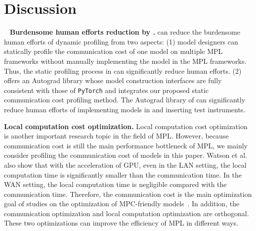 \section{Discussion}~\label{sec:dis}
\noindent\textbf{Burdensome human efforts reduction by \hawkeye.} \hawkeye can reduce the burdensome human efforts of dynamic profiling from two aspects: (1) model designers can statically profile the communication cost of one model on multiple MPL frameworks without manually implementing the model in the MPL frameworks. Thus, the static profiling process in \hawkeye can significantly reduce human efforts. (2) \hawkeye offers an Autograd library whose model construction interfaces are fully consistent with those of \texttt{PyTorch} and integrates our proposed static communication cost profiling method. The Autograd library of \hawkeye can significantly reduce human efforts of implementing models in \hawkeye and inserting test instruments.

\noindent\textbf{Local computation cost optimization.}
Local computation cost optimization~\cite{watson22piranha, cryptGPU} is another important research topic in the field of MPL. However, because communication cost is still the main performance bottleneck of MPL, we mainly consider profiling the communication cost of models in this paper. Watson et al.~\cite{watson22piranha} also show that with the acceleration of GPU, even in the LAN setting, the local computation time is significantly smaller than the communication time. In the WAN setting, the local computation time is negligible compared with the communication time. Therefore, the communication cost is the main optimization goal of studies on the optimization of MPC-friendly models~\cite{li2023mpcformer, ganesan2022efficient, MPCViT}. In addition, the communication optimization and local computation optimization are orthogonal. These two optimizations can improve the efficiency of MPL in different ways.

\noindent\textbf{} 

